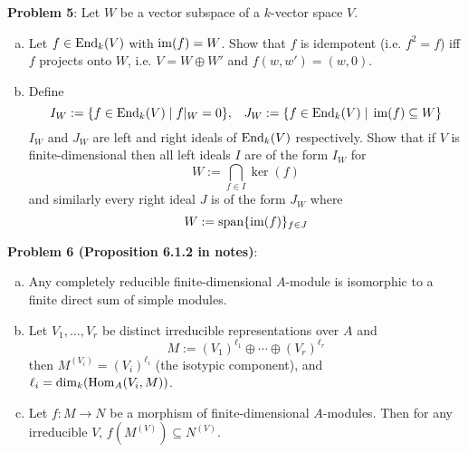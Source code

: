 \documentclass{amsart}
\begin{document}
	\newpage
	\textbf{Problem 5}: Let $W$ be a vector subspace of a $k$-vector space $V$.
	\begin{enumerate}[(a)]
		\item Let $f\in \operatorname{End}_k(V)$ with $\operatorname{im}(f)=W$. Show that $f$ is idempotent (i.e. $f^2=f$) iff $f$ projects onto $W$, i.e. $V=W\oplus W'$ and $f(w,w')=(w,0)$.
		\item Define 
		$$I_W := \{f\in \operatorname{End}_k(V) \; | \; f|_W=0 \}, \;\;\; J_W := \{f\in \operatorname{End}_k(V) \; | \; \operatorname{im}(f)\subseteq W\}$$
		$I_W$ and $J_W$ are left and right ideals of $\operatorname{End}_k(V)$ respectively. Show that if $V$ is finite-dimensional then all left ideals $I$ are of the form $I_W$ for 
		$$
		W := \bigcap_{f\in I} \ker(f)
		$$
		and similarly every right ideal $J$ is of the form $J_W$ where 
		$$
		W := \operatorname{span} \{\operatorname{im}(f)\}_{f\in J}
		$$
	\end{enumerate}
	
	\newpage
	\textbf{Problem 6 (Proposition 6.1.2 in notes)}: 
	\begin{enumerate}[(a)]
		\item Any completely reducible finite-dimensional $A$-module is isomorphic to a finite direct sum of simple modules.
		\item Let $V_1,\dots,V_r$ be distinct irreducible representations over $A$ and 
		$$
		M := (V_1)^{\ell_1} \oplus \cdots \oplus (V_r)^{\ell_r}
		$$
		then $M^{(V_i)}=(V_i)^{\ell_i}$ (the isotypic component), and $\ell_i=\dim_k(\operatorname{Hom}_A(V_i,M))$. 
		\item Let $f:M\to N$ be a morphism of finite-dimensional $A$-modules. Then for any irreducible $V$, $f(M^{(V)})\subseteq N^{(V)}$. 
	\end{enumerate}
\end{document}
